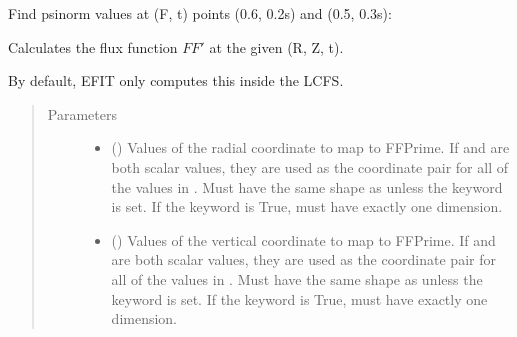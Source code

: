 \documentclass[letterpaper,10pt,english]{sphinxmanual}
\begin{document}
\begin{fulllineitems}
\begin{fulllineitems}
Find psinorm values at (F, t) points (0.6, 0.2s) and (0.5, 0.3s):

\begin{sphinxVerbatim}[commandchars=\\\{\}]
  \PYG{p}{[} \PYG{p}{]} \PYG{p}{[} \PYG{p}{]} 
\end{sphinxVerbatim}

\end{fulllineitems}


\begin{fulllineitems}
\label{\detokenize{eqtools:eqtools.core.Equilibrium.rz2FFPrime}}
Calculates the flux function \(FF'\) at the given (R, Z, t).

By default, EFIT only computes this inside the LCFS.
\begin{quote}\begin{description}
\item[{Parameters}] \leavevmode\begin{itemize}
\item {} 
 () \textendash{} Values of the radial coordinate to
map to FFPrime. If  and  are both scalar values,
they are used as the coordinate pair for all of the values in
. Must have the same shape as  unless the 
keyword is set. If the  keyword is True,  must
have exactly one dimension.

\item {} 
 () \textendash{} Values of the vertical coordinate to
map to FFPrime. If  and  are both scalar values,
they are used as the coordinate pair for all of the values in
. Must have the same shape as  unless the 
keyword is set. If the  keyword is True,  must
have exactly one dimension.


\end{itemize}
\end{description}
\end{quote}
\end{fulllineitems}
\end{fulllineitems}
\end{document}
